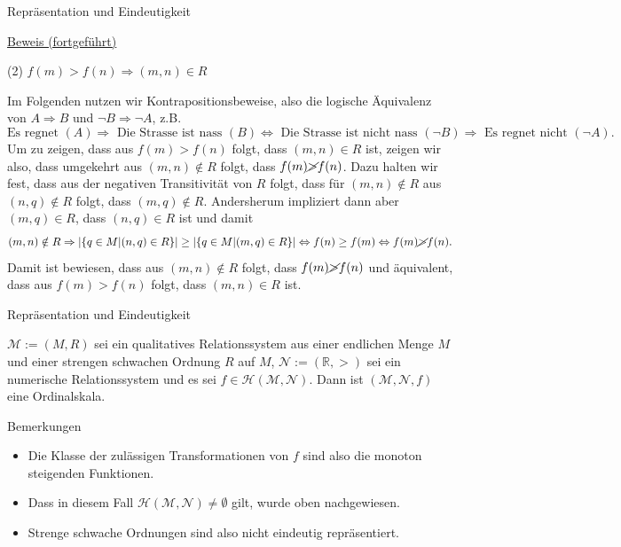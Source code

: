 \documentclass[
  8pt,
  ignorenonframetext,
]{beamer}
\providecommand{\tightlist}{%
  \setlength{\itemsep}{0pt}\setlength{\parskip}{0pt}}
\begin{document}
\begin{frame}{Repräsentation und Eindeutigkeit}
\protect\hypertarget{repruxe4sentation-und-eindeutigkeit-4}{}
\footnotesize

\underline{Beweis (fortgeführt)}

\noindent (2) \(f(m)>f(n) \Rightarrow (m,n) \in R\)

Im Folgenden nutzen wir Kontrapositionsbeweise, also die logische
Äquivalenz von \(A \Rightarrow B\) und \(\neg B \Rightarrow \neg A\),
z.B. \begin{equation*}
\mbox{Es regnet } (A)  \Rightarrow \mbox{ Die Strasse ist nass } (B) \Leftrightarrow \mbox{ Die Strasse ist nicht nass } (\neg B)  \Rightarrow  \mbox{ Es regnet nicht } (\neg A).
\end{equation*} Um zu zeigen, dass aus \(f(m)>f(n)\) folgt, dass
\((m,n) \in R\) ist, zeigen wir also, dass umgekehrt aus
\((m,n) \notin R\) folgt, dass \(f(m) \cancel{>} f(n)\). Dazu halten wir
fest, dass aus der negativen Transitivität von \(R\) folgt, dass für
\((m,n) \notin R\) aus \((n,q) \notin R\) folgt, dass
\((m,q) \notin R\). Andersherum impliziert dann aber \((m,q) \in R\),
dass \((n,q) \in R\) ist und damit \begin{equation*}
(m,n) \notin R \Rightarrow |\{q \in M|(n,q) \in R\}| \ge |\{q \in M|(m,q) \in R\}| \Leftrightarrow f(n) \ge f(m) \Leftrightarrow f(m) \cancel{>} f(n).
\end{equation*} Damit ist bewiesen, dass aus \((m,n) \notin R\) folgt,
dass \(f(m) \cancel{>} f(n)\) und äquivalent, dass aus \(f(m)>f(n)\)
folgt, dass \((m,n) \in R\) ist.
\end{frame}

\begin{frame}{Repräsentation und Eindeutigkeit}
\protect\hypertarget{repruxe4sentation-und-eindeutigkeit-5}{}
\small
\begin{theorem}
\justifying
\normalfont
$\mathcal{M} := (M,R)$ sei ein qualitatives Relationssystem aus einer endlichen Menge
$M$ und einer strengen schwachen Ordnung $R$ auf $M$, $\mathcal{N} := (\mathbb{R},>)$ sei
ein numerische Relationssystem und es sei $f \in \mathcal{H}(\mathcal{M},\mathcal{N})$.
Dann ist $(\mathcal{M},\mathcal{N},f)$ eine Ordinalskala.
\end{theorem}

\footnotesize

Bemerkungen

\begin{itemize}
\tightlist
\item
  Die Klasse der zulässigen Transformationen von \(f\) sind also die
  monoton steigenden Funktionen.
\item
  Dass in diesem Fall
  \(\mathcal{H}(\mathcal{M},\mathcal{N}) \neq \emptyset\) gilt, wurde
  oben nachgewiesen.
\item
  Strenge schwache Ordnungen sind also nicht eindeutig repräsentiert.
\end{itemize}
\end{frame}
\end{document}
